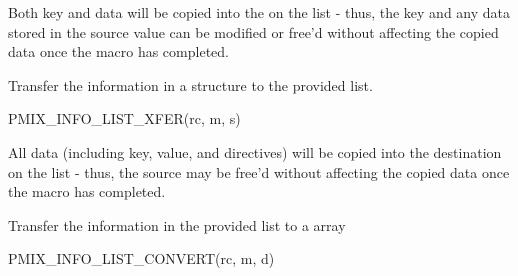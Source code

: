 \begin{arglist}
\end{arglist}

\adviceuserstart
Both key and data will be copied into the  on the list - thus, the key and any data stored in the source value can be modified or free'd without affecting the copied data once the macro has completed.
\adviceuserend


Transfer the information in a  structure to the provided list.

\cspecificstart
\begin{codepar}
PMIX_INFO_LIST_XFER(rc, m, s)
\end{codepar}
\cspecificend

\begin{arglist}
\end{arglist}

\adviceuserstart
All data (including key, value, and directives) will be copied into the destination  on the list - thus, the source  may be free'd without affecting the copied data once the macro has completed.
\adviceuserend


Transfer the information in the provided  list to a  array

\cspecificstart
\begin{codepar}
PMIX_INFO_LIST_CONVERT(rc, m, d)
\end{codepar}
\cspecificend

